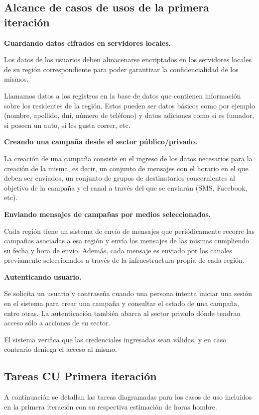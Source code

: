 \documentclass[a4paper, 10pt, twoside]{article}
\begin{document}
\subsection{Alcance de casos de usos de la primera iteración}
\textbf{Guardando datos cifrados en servidores locales.}

Los datos de los usuarios deben almacenarse encriptados en los servidores locales de su región correspondiente para poder garantizar la confidencialidad de los mismos.

Llamamos datos a los registros en la base de datos que contienen información sobre los residentes de la región. Estos pueden ser datos básicos como por ejemplo (nombre, apellido, dni, número de teléfono) y datos adiciones como si es fumador, si poseen un auto, si les gusta correr, etc.

\textbf{Creando una campaña desde el sector público/privado.}

La creación de una campaña consiste en el ingreso de los datos necesarios para la creación de la misma, es decir, un conjunto de mensajes con el horario en el que deben ser enviados, un conjunto de grupos de destinatarios concernientes al objetivo de la campaña y el canal a través del que se enviarán (SMS, Facebook, etc).

\textbf{Enviando mensajes de campañas por medios seleccionados.}

Cada región tiene un sistema de envío de mensajes que periódicamente recorre las campañas asociadas a esa región y envía los mensajes de las mismas cumpliendo su fecha y hora de envío. Además, cada mensaje es enviado por los canales previamente seleccionados a través de la infraestructura propia de cada región.

\textbf{Autenticando usuario.}

Se solicita un usuario y contraseña cuando una persona intenta iniciar una sesión en el sistema para crear una campaña y consultar el estado de una campaña, entre otras. La autenticación también abarca al sector privado dónde tendran acceso sólo a acciones de su sector.

El sistema verifica que las credenciales ingresadas sean válidas, y en caso contrario deniega el acceso al mismo.

\subsection{Tareas CU Primera iteración}
A continuación se detallan las tareas diagramadas para los casos de uso incluidos en la primera iteración con su respectiva estimación de horas hombre.
\\
\end{document}
